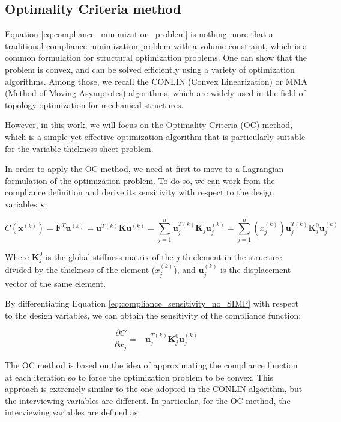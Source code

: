 \subsection{Optimality Criteria method}
\label{subsec:optimality_criteria}

Equation \ref{eq:compliance_minimization_problem} is nothing more that a traditional compliance minimization problem with a volume constraint, which is a common formulation for structural optimization problems.
One can show that the problem is convex, and can be solved efficiently using a variety of optimization algorithms.
Among those, we recall the CONLIN (Convex Linearization) or MMA (Method of Moving Asymptotes) algorithms, which are widely used in the field of topology optimization for mechanical structures.

However, in this work, we will focus on the Optimality Criteria (OC) method, which is a simple yet effective optimization algorithm that is particularly suitable for the variable thickness sheet problem.

In order to apply the OC method, we need at first to move to a Lagrangian formulation of the optimization problem.
To do so, we can work from the compliance definition and derive its sensitivity with respect to the design variables $\bm{x}$:

\begin{equation}
    C(\bm{x}^{(k)}) = \bm{F}^T \bm{u}^{(k)} = \bm{u}^{T(k)} \bm{K} \bm{u}^{(k)} = \sum_{j=1}^{n} \bm{u}_j^{T(k)} \bm{K}_j \bm{u}_j^{(k)} = \sum_{j=1}^{n} (x_j^{(k)}) \bm{u}_j^{T(k)} \bm{K}_j^0 \bm{u}_j^{(k)}
    \label{eq:compliance_sensitivity_no_SIMP}
\end{equation}

Where $\bm{K}_j^0$ is the global stiffness matrix of the $j$-th element in the structure divided by the thickness of the element ($x_j^{(k)}$), and $\bm{u}_j^{(k)}$ is the displacement vector of the same element.

By differentiating Equation \ref{eq:compliance_sensitivity_no_SIMP} with respect to the design variables, we can obtain the sensitivity of the compliance function:

\begin{equation}
    \frac{\partial C}{\partial x_j} = - \bm{u}_j^{T(k)} \bm{K}_j^0 \bm{u}_j^{(k)}
    \label{eq:compliance_sensitivity_derivative}
\end{equation}

The OC method is based on the idea of approximating the compliance function at each iteration so to force the optimization problem to be convex.
This approach is extremely similar to the one adopted in the CONLIN algorithm, but the interviewing variables are different.
In particular, for the OC method, the interviewing variables are defined as:

